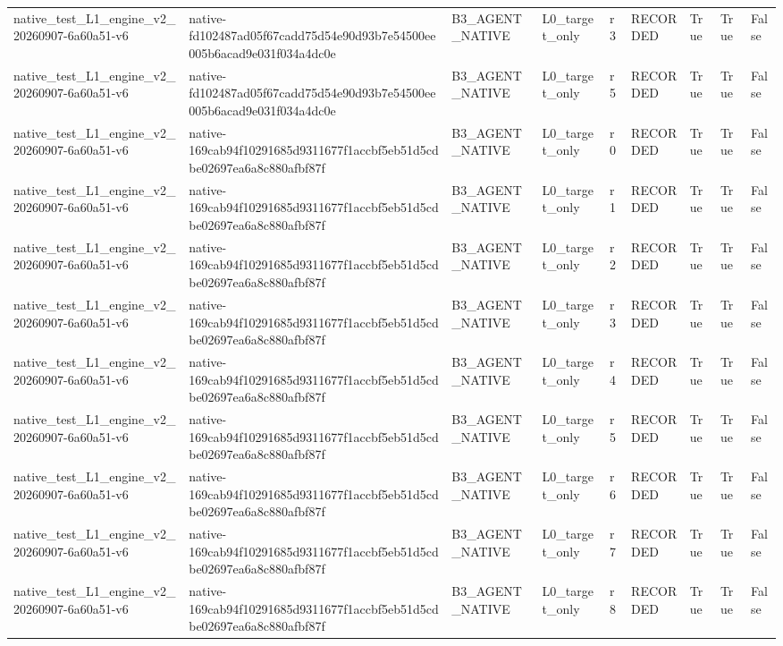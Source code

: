 \begin{tabular}{lllllllll}
native\_test\_L1\_engine\_v2\_20260907-6a60a51-v6 & native-fd102487ad05f67cadd75d54e90d93b7e54500ee005b6acad9e031f034a4dc0e & B3\_AGENT\_NATIVE & L0\_target\_only & r3 & RECORDED & True & True & False \\
native\_test\_L1\_engine\_v2\_20260907-6a60a51-v6 & native-fd102487ad05f67cadd75d54e90d93b7e54500ee005b6acad9e031f034a4dc0e & B3\_AGENT\_NATIVE & L0\_target\_only & r5 & RECORDED & True & True & False \\
native\_test\_L1\_engine\_v2\_20260907-6a60a51-v6 & native-169cab94f10291685d9311677f1accbf5eb51d5cdbe02697ea6a8c880afbf87f & B3\_AGENT\_NATIVE & L0\_target\_only & r0 & RECORDED & True & True & False \\
native\_test\_L1\_engine\_v2\_20260907-6a60a51-v6 & native-169cab94f10291685d9311677f1accbf5eb51d5cdbe02697ea6a8c880afbf87f & B3\_AGENT\_NATIVE & L0\_target\_only & r1 & RECORDED & True & True & False \\
native\_test\_L1\_engine\_v2\_20260907-6a60a51-v6 & native-169cab94f10291685d9311677f1accbf5eb51d5cdbe02697ea6a8c880afbf87f & B3\_AGENT\_NATIVE & L0\_target\_only & r2 & RECORDED & True & True & False \\
native\_test\_L1\_engine\_v2\_20260907-6a60a51-v6 & native-169cab94f10291685d9311677f1accbf5eb51d5cdbe02697ea6a8c880afbf87f & B3\_AGENT\_NATIVE & L0\_target\_only & r3 & RECORDED & True & True & False \\
native\_test\_L1\_engine\_v2\_20260907-6a60a51-v6 & native-169cab94f10291685d9311677f1accbf5eb51d5cdbe02697ea6a8c880afbf87f & B3\_AGENT\_NATIVE & L0\_target\_only & r4 & RECORDED & True & True & False \\
native\_test\_L1\_engine\_v2\_20260907-6a60a51-v6 & native-169cab94f10291685d9311677f1accbf5eb51d5cdbe02697ea6a8c880afbf87f & B3\_AGENT\_NATIVE & L0\_target\_only & r5 & RECORDED & True & True & False \\
native\_test\_L1\_engine\_v2\_20260907-6a60a51-v6 & native-169cab94f10291685d9311677f1accbf5eb51d5cdbe02697ea6a8c880afbf87f & B3\_AGENT\_NATIVE & L0\_target\_only & r6 & RECORDED & True & True & False \\
native\_test\_L1\_engine\_v2\_20260907-6a60a51-v6 & native-169cab94f10291685d9311677f1accbf5eb51d5cdbe02697ea6a8c880afbf87f & B3\_AGENT\_NATIVE & L0\_target\_only & r7 & RECORDED & True & True & False \\
native\_test\_L1\_engine\_v2\_20260907-6a60a51-v6 & native-169cab94f10291685d9311677f1accbf5eb51d5cdbe02697ea6a8c880afbf87f & B3\_AGENT\_NATIVE & L0\_target\_only & r8 & RECORDED & True & True & False \\

\end{tabular}
